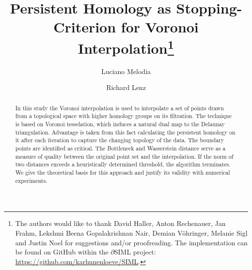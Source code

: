 \documentclass[runningheads]{llncs}
\begin{document}
%
\title{Persistent Homology as Stopping-Criterion for Voronoi Interpolation\thanks{The authors would like to thank David Haller, Anton Rechenauer, Jan Frahm, Lekshmi Beena Gopalakrishnan Nair, Demian Vöhringer, Melanie Sigl and Justin Noel for suggestions and/or proofreading. The implementation can be found on GitHub within the $\partial$SIML project: \url{https://github.com/karhunenloeve/SIML}.}}
%
%
\author{Luciano Melodia \\ \and
Richard Lenz}
%
%
%
\maketitle              %
%
\begin{abstract}
In this study the Voronoi interpolation is used to interpolate a set of points  drawn from a topological space with higher homology groups on its filtration. The technique is based on Voronoi tesselation, which induces a natural dual map to the Delaunay triangulation. Advantage is taken from this fact calculating the persistent homology on it after each iteration to capture the changing topology of the data. The boundary points are identified as critical. The Bottleneck and Wasserstein distance serve as a measure of quality between the original point set and the interpolation. If the norm of two distances exceeds a heuristically determined threshold, the algorithm terminates. We give the theoretical basis for this approach and justify its validity with numerical experiments.

\end{abstract}
\end{document}
